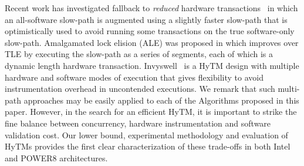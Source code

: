 Recent work has investigated fallback to \emph{reduced} hardware transactions~\cite{MS13}
in which an all-software slow-path is augmented using a slightly faster slow-path 
that is optimistically used to avoid running some transactions on the true software-only slow-path.
Amalgamated lock elision (ALE) was proposed in \cite{ale15} which improves over TLE
by executing the slow-path as a series of segments, each of which is a dynamic length hardware transaction.
Invyswell~\cite{Calciu14} is a HyTM design with multiple hardware and software modes of execution that gives flexibility to avoid instrumentation overhead in uncontended executions.
We remark that such multi-path approaches may be easily applied to each of the Algorithms proposed in this paper. However, 
in the search for an efficient HyTM, it is important to strike the fine balance between concurrency, hardware instrumentation and software validation cost.
Our lower bound, experimental methodology and evaluation of HyTMs provides the first clear characterization of these trade-offs in both Intel and POWER8 architectures. 
%